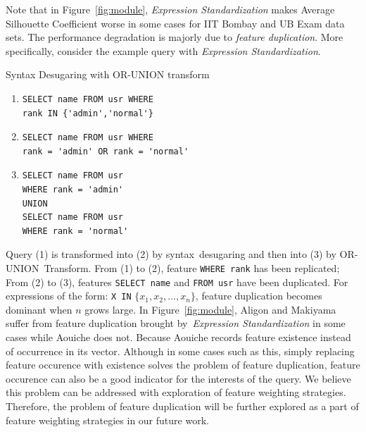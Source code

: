 Note that in Figure~\ref{fig:module}, \textit{Expression Standardization} makes Average Silhouette Coefficient worse in some cases for IIT Bombay and UB Exam data sets. The performance degradation is majorly due to \textit{feature duplication}. More specifically, consider the example query with \textit{Expression Standardization}.
\begin{example}
Syntax Desugaring with OR-UNION transform
{\footnotesize
\begin{enumerate}
\item\begin{verbatim}
SELECT name FROM usr WHERE 
rank IN {'admin','normal'}
\end{verbatim}
\item\begin{verbatim}
SELECT name FROM usr WHERE 
rank = 'admin' OR rank = 'normal'
\end{verbatim}
\item\begin{verbatim}
SELECT name FROM usr
WHERE rank = 'admin'
UNION
SELECT name FROM usr
WHERE rank = 'normal' 
\end{verbatim}
\end{enumerate}
}
\end{example}
Query (1) is transformed into (2) by syntax~desugaring and then into (3) by OR-UNION~Transform. From (1) to (2), feature \texttt{WHERE rank} has been replicated; From (2) to (3), features \texttt{SELECT name} and \texttt{FROM usr} have been duplicated. For expressions of the form: \texttt{X IN} $\{x_1,x_2,\dots,x_n\}$, feature duplication becomes dominant when $n$ grows large. In Figure~\ref{fig:module}, Aligon and Makiyama suffer from feature duplication brought by~\textit{Expression Standardization} in some cases while Aouiche does not. Because Aouiche records feature existence instead of occurrence in its vector. Although in some cases such as this, simply replacing feature occurence with existence solves the problem of feature duplication, feature occurence can also be a good indicator for the interests of the query. We believe this problem can be addressed with exploration of feature weighting strategies. Therefore, the problem of feature duplication will be further explored as a part of feature weighting strategies in our future work.

